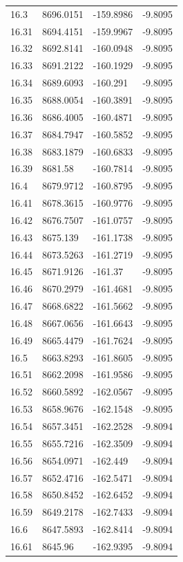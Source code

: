 \begin{table}[H]
\begin{tabular}{llll}
16.3 & 8696.0151 & -159.8986 & -9.8095 \\
16.31 & 8694.4151 & -159.9967 & -9.8095 \\
16.32 & 8692.8141 & -160.0948 & -9.8095 \\
16.33 & 8691.2122 & -160.1929 & -9.8095 \\
16.34 & 8689.6093 & -160.291 & -9.8095 \\
16.35 & 8688.0054 & -160.3891 & -9.8095 \\
16.36 & 8686.4005 & -160.4871 & -9.8095 \\
16.37 & 8684.7947 & -160.5852 & -9.8095 \\
16.38 & 8683.1879 & -160.6833 & -9.8095 \\
16.39 & 8681.58 & -160.7814 & -9.8095 \\
16.4 & 8679.9712 & -160.8795 & -9.8095 \\
16.41 & 8678.3615 & -160.9776 & -9.8095 \\
16.42 & 8676.7507 & -161.0757 & -9.8095 \\
16.43 & 8675.139 & -161.1738 & -9.8095 \\
16.44 & 8673.5263 & -161.2719 & -9.8095 \\
16.45 & 8671.9126 & -161.37 & -9.8095 \\
16.46 & 8670.2979 & -161.4681 & -9.8095 \\
16.47 & 8668.6822 & -161.5662 & -9.8095 \\
16.48 & 8667.0656 & -161.6643 & -9.8095 \\
16.49 & 8665.4479 & -161.7624 & -9.8095 \\
16.5 & 8663.8293 & -161.8605 & -9.8095 \\
16.51 & 8662.2098 & -161.9586 & -9.8095 \\
16.52 & 8660.5892 & -162.0567 & -9.8095 \\
16.53 & 8658.9676 & -162.1548 & -9.8095 \\
16.54 & 8657.3451 & -162.2528 & -9.8094 \\
16.55 & 8655.7216 & -162.3509 & -9.8094 \\
16.56 & 8654.0971 & -162.449 & -9.8094 \\
16.57 & 8652.4716 & -162.5471 & -9.8094 \\
16.58 & 8650.8452 & -162.6452 & -9.8094 \\
16.59 & 8649.2178 & -162.7433 & -9.8094 \\
16.6 & 8647.5893 & -162.8414 & -9.8094 \\
16.61 & 8645.96 & -162.9395 & -9.8094 \\

\end{tabular}
\end{table}
